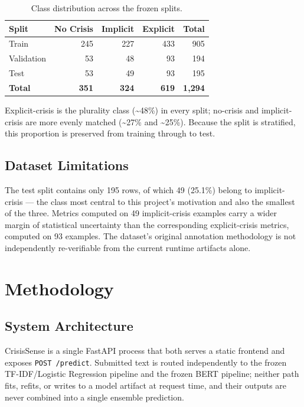 \documentclass[12pt,a4paper]{article}
\begin{document}
\begin{table}[H]
\centering
\caption{Class distribution across the frozen splits.}
\begin{tabular}{lrrrr}
\toprule
\textbf{Split} & \textbf{No Crisis} & \textbf{Implicit} & \textbf{Explicit} & \textbf{Total} \\
\midrule
Train      & 245 & 227 & 433 & 905 \\
Validation & 53  & 48  & 93  & 194 \\
Test       & 53  & 49  & 93  & 195 \\
\midrule
\textbf{Total} & \textbf{351} & \textbf{324} & \textbf{619} & \textbf{1{,}294} \\
\bottomrule
\end{tabular}
\end{table}

Explicit-crisis is the plurality class (\textasciitilde48\%) in every split; no-crisis and implicit-crisis are more evenly matched (\textasciitilde27\% and \textasciitilde25\%). Because the split is stratified, this proportion is preserved from training through to test.

\subsection{Dataset Limitations}

The test split contains only 195 rows, of which 49 (25.1\%) belong to implicit-crisis --- the class most central to this project's motivation and also the smallest of the three. Metrics computed on 49 implicit-crisis examples carry a wider margin of statistical uncertainty than the corresponding explicit-crisis metrics, computed on 93 examples. The dataset's original annotation methodology is not independently re-verifiable from the current runtime artifacts alone.

\section{Methodology}

\subsection{System Architecture}

CrisisSense is a single FastAPI process that both serves a static frontend and exposes \texttt{POST /predict}. Submitted text is routed independently to the frozen TF-IDF/Logistic Regression pipeline and the frozen BERT pipeline; neither path fits, refits, or writes to a model artifact at request time, and their outputs are never combined into a single ensemble prediction.
\end{document}
